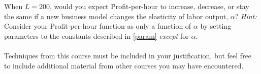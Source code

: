 \documentclass[11pt]{article}
\begin{document}
{\item When $L=200$, would you expect Profit-per-hour to increase, decrease, or stay the same if a new business model changes the elasticity of labor output, $\alpha$?  {\em Hint:} Consider your Profit-per-hour function as only a function of $\alpha$ by setting parameters to the constants described in \eqref{param} {\em except} for $\alpha$.  \\\\Techniques from this course must be included in your justification, but feel free to include additional material from other courses you may have encountered. 
}

    
\end{document}
